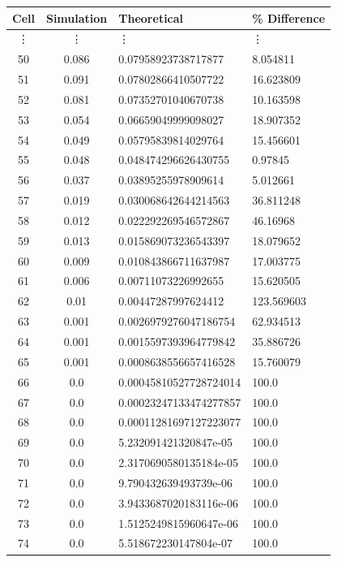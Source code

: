 \documentclass[11pt]{extarticle}
\begin{document}
\begin{enumerate}[(a)]
\begin{table}[ht!]
\begin{minipage}{0.5\textwidth}
\tiny
\begin{tabular}{ccll}
\toprule
\textbf{Cell} & \textbf{Simulation} & \textbf{Theoretical} & \textbf{\% Difference} \\
\midrule
\vdots & \vdots & \vdots & \vdots \\
50  &  0.086  &  0.07958923738717877  &  8.054811 \\
51  &  0.091  &  0.07802866410507722  &  16.623809 \\
52  &  0.081  &  0.07352701040670738  &  10.163598 \\
53  &  0.054  &  0.06659049999098027  &  18.907352 \\
54  &  0.049  &  0.05795839814029764  &  15.456601 \\
55  &  0.048  &  0.048474296626430755  &  0.97845 \\
56  &  0.037  &  0.03895255978909614  &  5.012661 \\
57  &  0.019  &  0.030068642644214563  &  36.811248 \\
58  &  0.012  &  0.022292269546572867  &  46.16968 \\
59  &  0.013  &  0.015869073236543397  &  18.079652 \\
60  &  0.009  &  0.010843866711637987  &  17.003775 \\
61  &  0.006  &  0.00711073226992655  &  15.620505 \\
62  &  0.01  &  0.00447287997624412  &  123.569603 \\
63  &  0.001  &  0.0026979276047186754  &  62.934513 \\
64  &  0.001  &  0.0015597393964779842  &  35.886726 \\
65  &  0.001  &  0.0008638556657416528  &  15.760079 \\
66  &  0.0  &  0.00045810527728724014  &  100.0 \\
67  &  0.0  &  0.00023247133474277857  &  100.0 \\
68  &  0.0  &  0.00011281697127223077  &  100.0 \\
69  &  0.0  &  5.232091421320847e-05  &  100.0 \\
70  &  0.0  &  2.3170690580135184e-05  &  100.0 \\
71  &  0.0  &  9.790432639493739e-06  &  100.0 \\
72  &  0.0  &  3.9433687020183116e-06  &  100.0 \\
73  &  0.0  &  1.5125249815960647e-06  &  100.0 \\
74  &  0.0  &  5.518672230147804e-07  &  100.0 \\

\end{tabular}
\end{minipage}
\end{table}
\end{enumerate}
\end{document}
